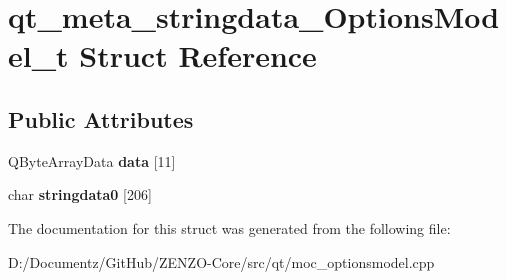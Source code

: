 \hypertarget{structqt__meta__stringdata___options_model__t}{}\section{qt\+\_\+meta\+\_\+stringdata\+\_\+\+Options\+Model\+\_\+t Struct Reference}
\label{structqt__meta__stringdata___options_model__t}
\subsection*{Public Attributes}
\begin{DoxyCompactItemize}
\item 
\mbox{\label{structqt__meta__stringdata___options_model__t_a77c95539043669bec54b6d3028747fbd}} 
Q\+Byte\+Array\+Data {\bfseries data} \mbox{[}11\mbox{]}
\item 
\mbox{\label{structqt__meta__stringdata___options_model__t_a08c49ccd5ca9f32dc2ee8d108d87af94}} 
char {\bfseries stringdata0} \mbox{[}206\mbox{]}
\end{DoxyCompactItemize}


The documentation for this struct was generated from the following file\+:\begin{DoxyCompactItemize}
\item 
D\+:/\+Documentz/\+Git\+Hub/\+Z\+E\+N\+Z\+O-\/\+Core/src/qt/moc\+\_\+optionsmodel.\+cpp\end{DoxyCompactItemize}
